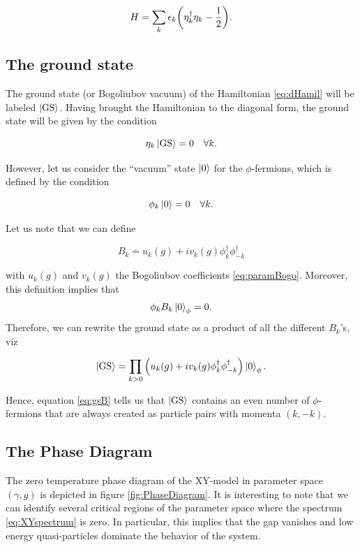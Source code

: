 \begin{equation}\label{eq:dHamil}
H = \sum_k\epsilon_k\qty(\eta_k^\dagger\eta_k -\frac{1}{2}).
\end{equation}


\subsection{The ground state}\label{ssec:groundstate}

The ground state (or Bogoliubov vacuum) of the Hamiltonian \eqref{eq:dHamil} will be labeled $\ket{\rm{GS}}$. Having brought the Hamiltonian to the diagonal form, the ground state will be given by the condition

\begin{equation}
    \eta_k \ket{\rm{GS}} = 0\quad \forall k.
\end{equation}

 However, let us consider the ``vacuum'' state $\ket 0$ for the $\phi$-fermions, which is defined by the condition 
 
 \begin{equation}
     \phi_k\ket 0 = 0\quad \forall k.
 \end{equation}
 
Let us note that we can define 

\begin{equation}
B_k \overset{.}{=} u_k(g)+ iv_k(g)\phi_k^\dagger \phi_{-k}^\dagger
\end{equation} 

with $u_k(g)$ and $v_k(g)$ the Bogoliubov coefficients \eqref{eq:paramBogo}. Moreover, this definition implies that $$\phi_k B_k\ket 0_\phi = 0.$$ Therefore, we can rewrite the ground state as a product of all the different $B_k$'s, viz

\begin{equation}
\ket{\rm{GS}} = \prod_{k>0} \qty(u_k(g)+ iv_k(g)\phi_k^\dagger \phi_{-k}^\dagger)\ket 0_\phi.\label{eq:gsB}
\end{equation}

Hence, equation \eqref{eq:gsB} tells us that $\ket{\text{GS}}$ contains an even number of $\phi$-fermions that are always created as particle pairs with momenta $(k,-k)$.

\subsection{The Phase Diagram}\label{ssec:PhaseDiag}

The zero temperature phase diagram of the XY-model in parameter space $(\gamma,g)$ is depicted in figure \ref{fig:PhaseDiagram}. It is interesting to note that we can identify several critical regions of the parameter space where the spectrum \eqref{eq:XYspectrum} is zero. In particular, this implies that the gap vanishes and low energy quasi-particles dominate the behavior of the system. 

